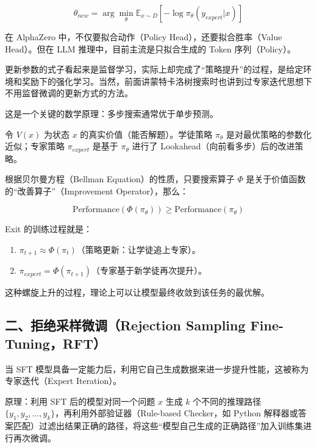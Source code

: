 \[
\theta_{new}=\arg\min_\theta \mathbb{E}_{x\sim D}\left[-\log\pi_\theta(y_{expert}|x)\right]
\]

在 AlphaZero 中，不仅要拟合动作（Policy Head），还要拟合胜率（Value Head）。但在 LLM 推理中，目前主流是只拟合生成的 Token 序列（Policy）。

更新参数的式子看起来是监督学习，实际上却完成了``策略提升''的过程，是给定环境和奖励下的强化学习。当然，前面讲蒙特卡洛树搜索时也讲到过专家迭代思想下不用监督微调的更新方式的方法。

这是一个关键的数学原理：多步搜索通常优于单步预测。

令 \(V(x)\) 为状态 \(x\) 的真实价值（能否解题）。学徒策略 \(\pi_\theta\) 是对最优策略的参数化近似；专家策略 \(\pi_{expert}\) 是基于 \(\pi_\theta\) 进行了 Lookahead（向前看多步）后的改进策略。

根据贝尔曼方程（Bellman Equation）的性质，只要搜索算子 \(\Phi\) 是关于价值函数的``改善算子''（Improvement Operator），那么：

\[
\mathrm{Performance}(\Phi(\pi_\theta))\ge \mathrm{Performance}(\pi_\theta)
\]

Exit 的训练过程就是：

\begin{enumerate}
\def\labelenumi{\arabic{enumi}.}
\tightlist
\item
  \(\pi_{t+1}\approx\Phi(\pi_t)\)（策略更新：让学徒追上专家）。
\item
  \(\pi_{expert}=\Phi(\pi_{t+1})\)（专家基于新学徒再次提升）。
\end{enumerate}

这种螺旋上升的过程，理论上可以让模型最终收敛到该任务的最优解。

\hypertarget{ux4e8cux62d2ux7eddux91c7ux6837ux5faeux8c03rejection-sampling-fine-tuningrft}{%
\subsection{二、拒绝采样微调（Rejection Sampling Fine-Tuning，RFT）}\label{ux4e8cux62d2ux7eddux91c7ux6837ux5faeux8c03rejection-sampling-fine-tuningrft}}

当 SFT 模型具备一定能力后，利用它自己生成数据来进一步提升性能，这被称为专家迭代（Expert Iteration）。

原理：利用 SFT 后的模型对同一个问题 \(x\) 生成 \(k\) 个不同的推理路径 \(\{y_1,y_2,\ldots,y_k\}\)，再利用外部验证器（Rule-based Checker，如 Python 解释器或答案匹配）过滤出结果正确的路径，将这些``模型自己生成的正确路径''加入训练集进行再次微调。

